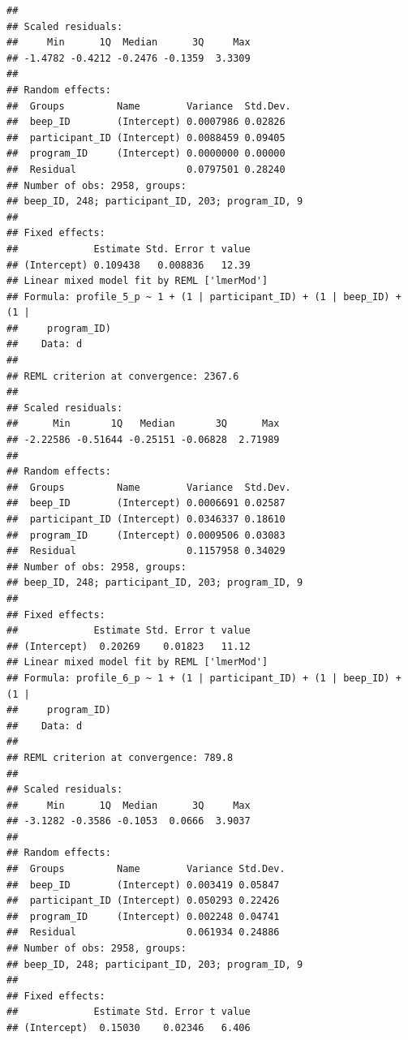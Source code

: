 \documentclass[]{msu-thesis}
\theoremstyle{definition}
\theoremstyle{definition}
\theoremstyle{definition}
\theoremstyle{remark}
\begin{document}
\begin{verbatim}
## 
## Scaled residuals: 
##     Min      1Q  Median      3Q     Max 
## -1.4782 -0.4212 -0.2476 -0.1359  3.3309 
## 
## Random effects:
##  Groups         Name        Variance  Std.Dev.
##  beep_ID        (Intercept) 0.0007986 0.02826 
##  participant_ID (Intercept) 0.0088459 0.09405 
##  program_ID     (Intercept) 0.0000000 0.00000 
##  Residual                   0.0797501 0.28240 
## Number of obs: 2958, groups:  
## beep_ID, 248; participant_ID, 203; program_ID, 9
## 
## Fixed effects:
##             Estimate Std. Error t value
## (Intercept) 0.109438   0.008836   12.39
## Linear mixed model fit by REML ['lmerMod']
## Formula: profile_5_p ~ 1 + (1 | participant_ID) + (1 | beep_ID) + (1 |  
##     program_ID)
##    Data: d
## 
## REML criterion at convergence: 2367.6
## 
## Scaled residuals: 
##      Min       1Q   Median       3Q      Max 
## -2.22586 -0.51644 -0.25151 -0.06828  2.71989 
## 
## Random effects:
##  Groups         Name        Variance  Std.Dev.
##  beep_ID        (Intercept) 0.0006691 0.02587 
##  participant_ID (Intercept) 0.0346337 0.18610 
##  program_ID     (Intercept) 0.0009506 0.03083 
##  Residual                   0.1157958 0.34029 
## Number of obs: 2958, groups:  
## beep_ID, 248; participant_ID, 203; program_ID, 9
## 
## Fixed effects:
##             Estimate Std. Error t value
## (Intercept)  0.20269    0.01823   11.12
## Linear mixed model fit by REML ['lmerMod']
## Formula: profile_6_p ~ 1 + (1 | participant_ID) + (1 | beep_ID) + (1 |  
##     program_ID)
##    Data: d
## 
## REML criterion at convergence: 789.8
## 
## Scaled residuals: 
##     Min      1Q  Median      3Q     Max 
## -3.1282 -0.3586 -0.1053  0.0666  3.9037 
## 
## Random effects:
##  Groups         Name        Variance Std.Dev.
##  beep_ID        (Intercept) 0.003419 0.05847 
##  participant_ID (Intercept) 0.050293 0.22426 
##  program_ID     (Intercept) 0.002248 0.04741 
##  Residual                   0.061934 0.24886 
## Number of obs: 2958, groups:  
## beep_ID, 248; participant_ID, 203; program_ID, 9
## 
## Fixed effects:
##             Estimate Std. Error t value
## (Intercept)  0.15030    0.02346   6.406
\end{verbatim}
\end{document}
